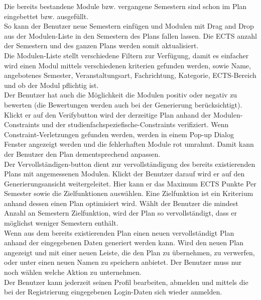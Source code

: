 Die bereits bestandene Module bzw. vergangene Semestern sind schon im Plan eingebettet bzw. ausgefüllt.\\
So kann der Benutzer neue Semestern einfügen und Modulen mit Drag and Drop aus der Modulen-Liste in den Semestern des Plans fallen lassen. Die ECTS anzahl der Semestern und des ganzen Plans werden somit aktualisiert. \\

Die Modulen-Liste stellt verschiedene Filtern zur Verfügung, damit es einfacher wird einen Modul mittels verschiedenen kriterien gefunden werden, sowie Name, angebotenes Semester,  Veranstaltungsart, Fachrichtung, Kategorie, ECTS-Bereich und ob der Modul pflichtig ist.\\

Der Benutzer hat auch die Möglichkeit die Modulen positiv oder negativ zu bewerten (die Bewertungen werden auch bei der Generierung berücksichtigt).\\
Klickt er auf den Verifybutton wird der derzeitige Plan anhand der Modulen-Constraints und der studienfachspeziefische-Constraints verifiziert. Wenn Constraint-Verletzungen gefunden werden, werden in einem Pop-up Dialog Fenster angezeigt werden und die fehlerhaften Module rot umrahmt. Damit kann der Benutzer den Plan dementsprechend anpassen.\\

Der Vervollständigen-button dient zur vervollständigung des bereits existierenden Plans mit angemessenen Modulen. Klickt der Benutzer darauf  wird er auf den Generierungsansicht weitergeleitet. Hier kann er das Maximum ECTS Punkte Per Semester sowie die Zielfunktionen auswählen. Eine Zielfunktion ist ein Kriterium anhand dessen einen Plan optimisiert wird. Wählt der Benutzer die mindest Anzahl an Semestern Zielfunktion, wird der Plan so vervollständigt, dass er möglichst weniger Semestern enthält.  \\

Wenn aus dem bereits existierenden Plan einen neuen vervollständigt Plan anhand der eingegebenen Daten generiert werden kann. Wird den neuen Plan angezeigt und mit einer neuen Leiste, die den Plan zu übernehmen, zu verwerfen, oder unter einen neuen Namen zu speichern anbietet. Der Benutzer muss nur noch wählen welche Aktion zu unternehmen.\\

Der Benutzer kann jederzeit seinen Profil bearbeiten, abmelden und mittels die bei der Registrierung eingegebenen Login-Daten sich wieder anmelden.